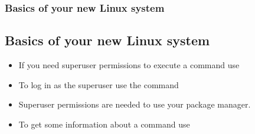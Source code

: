 \begin{frame}
	\frametitle{Basics of your new Linux system}
	\subsection{Basics of your new Linux system}
	
	\begin{itemize}
		\item If you need superuser permissions to execute a command use 
		\item To log in as the superuser use the command 
		\item Superuser permissions are needed to use your package manager.
		\item To get some information about a command use 
	\end{itemize}
\end{frame}
